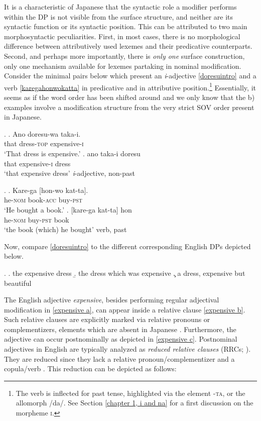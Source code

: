 It is a characteristic of Japanese that the syntactic role a modifier performs within the DP is not visible from the surface structure, and neither are its syntactic function or its syntactic position. This can be attributed to two main morphosyntactic peculiarities. First, in most cases, there is no morphological difference between attributively used lexemes and their predicative counterparts. Second, and perhaps more importantly, there is \textit{only one} surface construction, only one mechanism available for lexemes partaking in nominal modification. Consider the minimal pairs below which present an \textit{i}-adjective \ref{doresuintro} and a verb \ref{karegahonwokatta} in predicative and in attributive position.\footnote{The verb is inflected for past tense, highlighted via the element -\textsc{ta}, or the allomorph /da/. See Section \ref{chapter 1, i and na} for a first discussion on the morpheme \textsc{i}.} Essentially, it seems as if the word order has been shifted around and we only know that the b) examples involve a modification structure from the very strict SOV order present in Japanese.

\ex. \label{doresuintro} \ag. Ano doresu-wa taka-i.\\
that dress-\textsc{top} expensive-\textsc{i}\\
`That dress is expensive.'
\bg. ano taka-i doresu\\
that expensive-\textsc{i} dress\\
`that expensive dress' \null \hfill \textit{i}-adjective, non-past

\ex. \label{karegahonwokatta} \ag. Kare-ga [hon-wo kat-ta].\\
he-\textsc{nom} book-\textsc{acc} buy-\textsc{pst}\\
`He bought a book.’
\bg. [kare-ga kat-ta] hon\\
he-\textsc{nom} buy-\textsc{pst} book\\
`the book (which) he bought' \null \hfill verb, past \label{kare-ga}

Now, compare \ref{doresuintro} to the different corresponding English DPs depicted below. 

\ex. \a. the expensive dress \label{expensive a}
\b. the dress which was expensive \label{expensive b}
\c. a dress, expensive but beautiful \label{expensive c}

The English adjective \textit{expensive}, besides performing regular adjectival modification in \ref{expensive a}, can appear inside a relative clause \ref{expensive b}. Such relative clauses are explicitly marked via relative pronouns or complementizers, elements which are absent in Japanese \citep{kuno:1973:structure, comrie:1998:rethinking}. Furthermore, the adjective can occur postnominally as depicted in \ref{expensive c}. Postnominal adjectives in English are typically analyzed as \textit{reduced relative clauses} (RRCs; \citealt{sadler:1994:prenominal, larson:1998:events, cinque:2010:adj}). They are reduced since they lack a relative pronoun/complementizer and a copula/verb \citep{douglas:2016:syntactic, harwood:2018:rrc}. This reduction can be depicted as follows:

